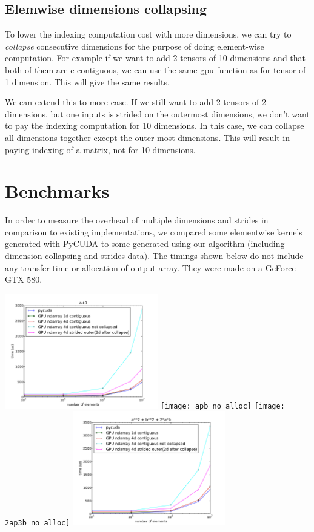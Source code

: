 \documentclass{article} %
\begin{document}
\subsection{Elemwise dimensions collapsing}
To lower the indexing computation cost with more dimensions, we can
try to \emph{collapse} consecutive dimensions for the purpose of doing
element-wise computation. For example if we want to add 2 tensors of
10 dimensions and that both of them are c contiguous, we can use the
same gpu function as for tensor of 1 dimension. This will give the
same results.

We can extend this to more case. If we still want to add 2 tensors of
2 dimensions, but one inputs is strided on the outermost dimensions,
we don't want to pay the indexing computation for 10 dimensions. In
this case, we can collapse all dimensions together except the outer
most dimensions. This will result in paying indexing of a matrix, not
for 10 dimensions.

\section{Benchmarks}

In order to measure the overhead of multiple dimensions and strides in comparison to existing implementations, we compared some elementwise kernels generated with PyCUDA to some generated using our algorithm (including dimension collapsing and strides data).
The timings shown below do not include any transfer time or allocation of output array.
They were made on a GeForce GTX 580.

\includegraphics[width=0.5\textwidth]{ap1_no_alloc}
\texttt{[image: apb\_no\_alloc]}
\texttt{[image: 2ap3b\_no\_alloc]}
\includegraphics[width=0.5\textwidth]{a2pb2p2ab_no_alloc}
\end{document}
